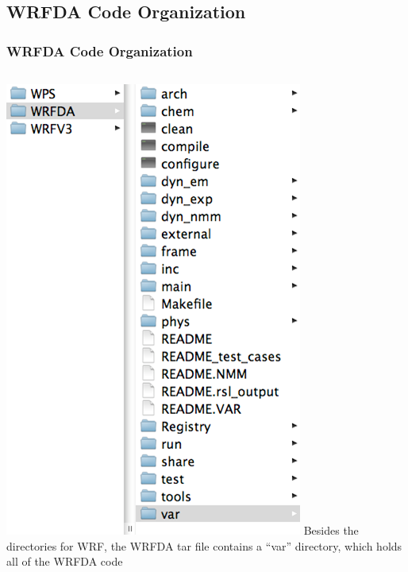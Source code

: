 \documentclass{beamer}
\begin{document}
\subsection{WRFDA Code Organization}
\begin{frame}
\frametitle{WRFDA Code Organization}
\begin{columns}[c]
\column{5cm}
\includegraphics[scale=0.4]{wrfdaCode}
\column{7cm}
Besides the directories for WRF, the WRFDA tar file contains a “var” directory, which holds all of the WRFDA code
\end{columns}
\end{frame}
\end{document}
